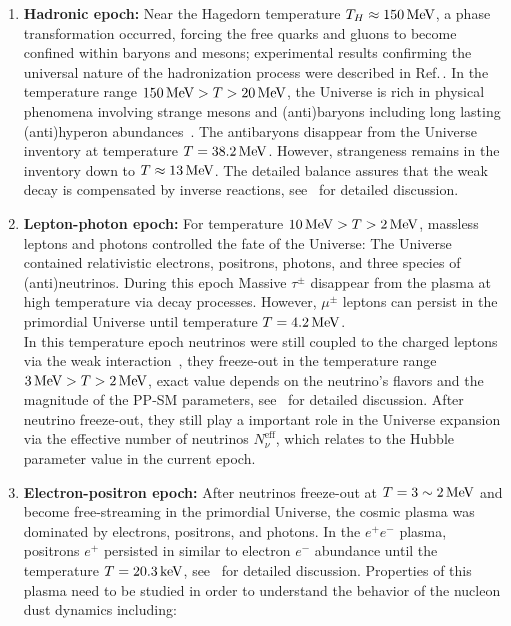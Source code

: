 \begin{enumerate}
\item \textbf{Hadronic epoch:} Near the Hagedorn temperature $T_H\approx 150\text{\,MeV}$, a phase transformation occurred, forcing the free quarks and gluons to become confined within baryons and mesons; experimental results confirming the universal nature of the hadronization process were described in Ref.\,\cite{Letessier:2005qe}. In the temperature range $ 150\text{\,MeV} >T>20\text{\,MeV}$, the Universe is rich in physical phenomena involving strange mesons and (anti)baryons including long lasting (anti)hyperon abundances~\cite{Fromerth:2012fe,Yang:2021bko}. The antibaryons disappear from the Universe inventory at temperature $T=38.2\text{\,MeV}$. However, strangeness remains in the inventory down to $T\approx13\text{\,MeV}$. The detailed balance assures that the weak decay is compensated by inverse reactions, see~ for detailed discussion.
%
\item \textbf{Lepton-photon epoch:} For temperature $10\text{\,MeV} >T>2\text{\,MeV}$, massless leptons and photons controlled the fate of the Universe: The Universe contained relativistic electrons, positrons, photons, and three species of (anti)neutrinos. During this epoch Massive $\tau^\pm$ disappear from the plasma at high temperature via decay processes. However, $\mu^\pm$ leptons can persist in the primordial Universe until temperature $T=4.2\text{\,MeV}$.\\[0.2cm]
%
In this temperature epoch neutrinos were still coupled to the charged leptons via the weak interaction~\cite{Birrell:2014ona,Birrell:2012gg}, they freeze-out in the temperature range $3\text{\,MeV} >T>2\text{\,MeV}$, exact value depends on the neutrino's flavors and the magnitude of the PP-SM parameters, see~ for detailed discussion. After neutrino freeze-out, they still play a important role in the Universe expansion via the effective number of neutrinos $N_{\nu}^{\mathrm{eff}}$, which relates to the Hubble parameter value in the current epoch.
%
\item \textbf{Electron-positron epoch:} After neutrinos freeze-out at $T=3\sim 2\text{\,MeV}$ and become free-streaming in the primordial Universe, the cosmic plasma was dominated by electrons, positrons, and photons. In the $e^+e^-$ plasma, positrons $e^+$ persisted in similar to electron $e^-$ abundance until the temperature $T=20.3\text{\,keV}$, see~ for detailed discussion. Properties of this plasma need to be studied in order to understand the behavior of the nucleon dust dynamics including:

\end{enumerate}
